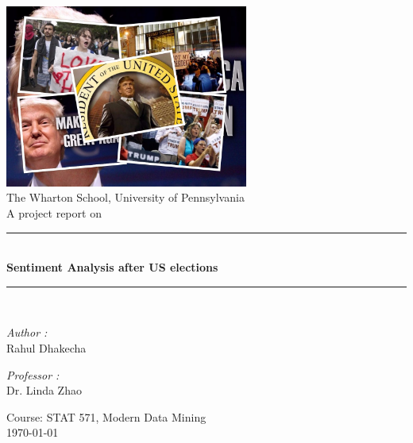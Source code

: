 \documentclass[a4paper,12pt]{book}
\theoremstyle{break}
\begin{document}



\begin{titlepage}
\begin{center}

\includegraphics[width=0.6\textwidth]{logo}\\[1cm]

{\large The Wharton School, University of Pennsylvania}\\[0.5cm]

{\large A project report on}\\[0.5cm]

\rule{\linewidth}{0.5mm} \\[0.4cm]
{ \huge \bfseries Sentiment Analysis after US elections \\[0.4cm] }
\rule{\linewidth}{0.5mm} \\[1.5cm]

\noindent
\begin{minipage}{0.4\textwidth}
  \begin{flushleft} \large
    \emph{Author :}\\
    Rahul Dhakecha
  \end{flushleft}
\end{minipage}%
\begin{minipage}{0.4\textwidth}
  \begin{flushright} \large
    \emph{Professor :} \\
    Dr. Linda Zhao 
  \end{flushright}
\end{minipage}

\vfill

{\large Course: STAT 571, Modern Data Mining\\ \today}

\end{center}
\end{titlepage}
\end{document}
